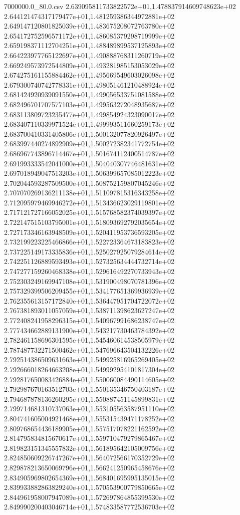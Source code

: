\begin{filecontents*}{7000000.0_80.0.csv}
2.639095811733822572e+01,1.478837914609748623e+02
2.644121474317179477e+01,1.481259386344972881e+02
2.649147120801825039e+01,1.483675208072763780e+02
2.654172752596571172e+01,1.486085379298719999e+02
2.659198371112704251e+01,1.488489899537125893e+02
2.664223977765122697e+01,1.490888768311260719e+02
2.669249573972544809e+01,1.493281985153053029e+02
2.674275161155884462e+01,1.495669549603026098e+02
2.679300740742778331e+01,1.498051461210488924e+02
2.681424920939091550e+01,1.499056533751081588e+02
2.682496701707577103e+01,1.499563272048935687e+02
2.683113809723235477e+01,1.499854924323090017e+02
2.683407110339971524e+01,1.499993511660259173e+02
2.683700410331405806e+01,1.500132077820926497e+02
2.683997440274892909e+01,1.500272382341772754e+02
2.686967743896714467e+01,1.501674112400514787e+02
2.691993333542041000e+01,1.504040307746481631e+02
2.697018949047513203e+01,1.506399657085012223e+02
2.702044593287509500e+01,1.508752159807045246e+02
2.707070269136211138e+01,1.511097815316343258e+02
2.712095979469946272e+01,1.513436623029119801e+02
2.717121727166052025e+01,1.515768582374039397e+02
2.722147515103795001e+01,1.518093692792035654e+02
2.727173346163948509e+01,1.520411953736593205e+02
2.732199223225466866e+01,1.522723364673183823e+02
2.737225149173335836e+01,1.525027925079284614e+02
2.742251126889593493e+01,1.527325634444732714e+02
2.747277159260468338e+01,1.529616492270733943e+02
2.752303249169947108e+01,1.531900498070781396e+02
2.757329399506209455e+01,1.534177651369936939e+02
2.762355613157172840e+01,1.536447951704722072e+02
2.767381893011057059e+01,1.538711398623627247e+02
2.772408241958296315e+01,1.540967991686238747e+02
2.777434662889131900e+01,1.543217730463784392e+02
2.782461158696301595e+01,1.545460614538505979e+02
2.787487732271500462e+01,1.547696643504132226e+02
2.792514386509631663e+01,1.549925816965269405e+02
2.792666018264663208e+01,1.549992954101817304e+02
2.792817650083426884e+01,1.550060084490114605e+02
2.792987670163512703e+01,1.550135346750403187e+02
2.794687878136260295e+01,1.550887451145899831e+02
2.799714681310737063e+01,1.553105563587951110e+02
2.804741605004921468e+01,1.555315439471178252e+02
2.809768654436189905e+01,1.557517078221162592e+02
2.814795834815670617e+01,1.559710479279865467e+02
2.819823151345557832e+01,1.561895642105009756e+02
2.824850609226747267e+01,1.564072566170352729e+02
2.829878213650069796e+01,1.566241250965458676e+02
2.834905969802654369e+01,1.568401695995135015e+02
2.839933882863829240e+01,1.570553900779850665e+02
2.844961958007947089e+01,1.572697864855399530e+02
2.849990200403046714e+01,1.574833587772536703e+02

\end{filecontents*}

